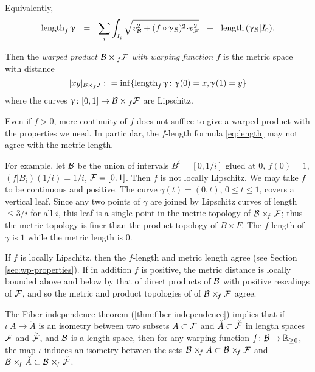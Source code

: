 Equivalently,  
\[
\length_f\gamma\  \ =\ \  \sum_i \int _{I_i}\sqrt{
v_\spc{B}^2+ (f\circ\gamma_\spc{B})^2\cdot v_\spc{F}^2}  \ \ +\ \  \length\, (\gamma_\spc{B}|I_0).
\]
 
 Then the \emph{warped product $\spc{B}\times_f\spc{F}$ with warping function $f$} is the metric  space with distance
 \[
 |xy|_{\spc{B}\times_f\spc{F}}\: =\inf\{\length_f\gamma\: 
\gamma(0)=x, \gamma(1)=y\}
 \]
 where the curves $\gamma\:[0,1]\to \spc{B}\times_f\spc{F}$ are Lipschitz. 

\medskip

Even if $f>0$, mere continuity of $f$ does not suffice to give a warped product with the properties we need. In particular,  the $f$-length formula \ref{eq:length} may not agree with the metric length.

For example, let $\mathcal{B}$ be the union of intervals $B^i=[0,1/i]$ glued at $0$, $f(0)=1$, $(f|B_i)(1/i)=1/i$, 
$\mathcal{F}=[0,1]$. Then $f$ is not locally Lipschitz. We may take $f$ to be continuous and positive. 
The curve $\gamma(t)=(0,t)$, $0\le t \le 1$, covers a vertical leaf. Since  any two points of $\gamma$ are joined by Lipschitz curves of length $\le 3/i$ for all $i$,
this leaf is a single point in the metric topology of $\spc{B}\warp{f} \spc{F}$; thus the metric topology is finer than the product topology of $B\times F$. The $f$-length of $\gamma$ is $1$ while the metric length is $0$. 

If  $f$ is  locally Lipschitz, then the $f$-length and metric length agree (see Section \ref{sec:wp-properties}).  If in addition $f$ is positive, the metric distance is locally bounded above and below by that of direct products of $\mathcal{B}$ with positive rescalings of $\mathcal{F}$, and so the metric and product topologies of of $\spc{B}\warp{f} \spc{F}$ agree. 

\vspace{3mm}

The  Fiber-independence theorem (\ref{thm:fiber-independence}) implies that if $\iota\:A\to \check A$ is an isometry between two subsets
$A\subset \spc{F}$ and $\check A\subset \check{\spc{F}}$
in length spaces $ \mathcal{F}$ and $\check{\mathcal{F}}$, and $\mathcal{B}$ is a length space, then for any warping function $f\:\spc{B}\to\RR_{\ge0}$,
the map $\iota$ induces an isometry between the sets 
$\spc{B}\warp{f} A \subset \spc{B}\warp{f} \spc{F}$ and $\spc{B}\warp{f}\check{A}\subset \spc{B}\warp{f} \check{\spc{F}}$.

